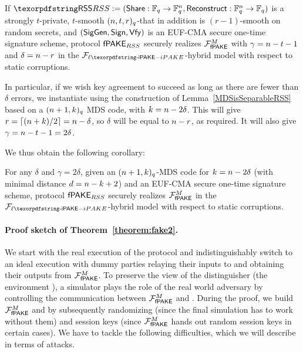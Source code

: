 
\begin{theorem}
\label{theorem:fake2}
If $\RSS:=(\Share:\F_q \to \F_q^\pwlen,\Reconstruct:\F_q^\pwlen \to \F_q)$ is a strongly $t$-private, $t$-smooth $(n,t,r)_q$-\RSS that in addition is $(r-1)$-smooth on random secrets, and $(\mathsf{SigGen},\mathsf{Sign},\mathsf{Vfy})$ is an EUF-CMA secure one-time signature scheme, protocol $\textsf{fPAKE}_{RSS}$ securely realizes $\mathcal{F}_\textsf{fPAKE}^M$ with $\gamma = n-t-1$ and $\delta = n-r$ in the $\Flipake$-hybrid model with respect to static corruptions. 
\end{theorem} 

In particular, if we wish key agreement to succeed as long as there are fewer than $\delta$ errors, we instantiate \RSS using the construction of Lemma~\ref{MDSisSeparableRSS} based on a $(n+1, k)_q$ MDS code, with $k = n-2\delta$. This will give $r  = \lceil (n+k)/2 \rceil = n - \delta$, so $\delta$ will be equal to $n-r$, as required. It will also give $\gamma = n-t-1 = 2\delta$.

We thus obtain the following corollary:

\begin{corollary}
For any $\delta$ and $\gamma = 2\delta$, 
given an $(n+1,k)_q$-MDS code for $k = n-2\delta$ (with minimal distance $d = n - k +2$) and an EUF-CMA secure one-time signature scheme, protocol $\textsf{fPAKE}_{RSS}$ securely realizes $\mathcal{F}_\textsf{fPAKE}^M$ in the $\Flipake$-hybrid model with respect to static corruptions. 
\end{corollary}


\paragraph{Proof sketch of Theorem~\ref{theorem:fake2}.} We start with the real execution of the protocol and indistinguishably switch to an ideal execution with dummy parties relaying their inputs to and obtaining their outputs from $\mathcal{F}_\textsf{fPAKE}^M$. To preserve the view of the distinguisher (the environment \Env), a simulator \Sim plays the role of the real world adversary by controlling the communication between $\mathcal{F}_\textsf{fPAKE}^M$ and \Env. During the proof, we build $\mathcal{F}_\textsf{fPAKE}^M$ and \Sim by subsequently randomizing \passwords (since the final simulation has to work without them) and session keys (since $\mathcal{F}_\textsf{fPAKE}^M$ hands out random session keys in certain cases). We have to tackle the following difficulties, which we will describe in terms of attacks. 

